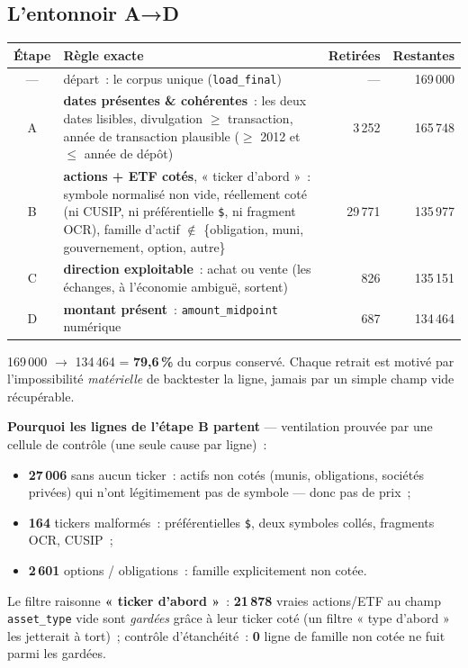 \documentclass[11pt,a4paper]{article}
\newcommand{\co}[1]{\texttt{\small #1}}
\begin{document}
\subsection{L'entonnoir A→D}
\begin{center}\small
\begin{tabular}{c p{9.2cm} r r}
\toprule
\bfseries Étape & \bfseries Règle exacte & \bfseries Retirées & \bfseries Restantes\\
\midrule
— & départ~: le corpus unique (\co{load_final}) & — & 169\,000 \\
A & \textbf{dates présentes \& cohérentes}~: les deux dates lisibles, divulgation $\geq$ transaction,
    année de transaction plausible ($\geq$ 2012 et $\leq$ année de dépôt) & 3\,252 & 165\,748 \\
B & \textbf{actions + ETF cotés}, « ticker d'abord »~: symbole normalisé non vide, réellement coté
    (ni CUSIP, ni préférentielle \co{\$}, ni fragment OCR), famille d'actif
    $\notin$ \{obligation, muni, gouvernement, option, autre\} & 29\,771 & 135\,977 \\
C & \textbf{direction exploitable}~: achat ou vente (les échanges, à l'économie ambiguë, sortent) & 826 & 135\,151 \\
D & \textbf{montant présent}~: \co{amount_midpoint} numérique & 687 & 134\,464 \\
\bottomrule
\end{tabular}
\end{center}
{\footnotesize 169\,000 $\rightarrow$ 134\,464 = \textbf{79,6\,\%} du corpus conservé. Chaque retrait est
motivé par l'impossibilité \emph{matérielle} de backtester la ligne, jamais par un simple champ vide
récupérable.}

\textbf{Pourquoi les lignes de l'étape B partent} — ventilation prouvée par une cellule de contrôle
(une seule cause par ligne)~:
\begin{itemize}[nosep,leftmargin=1.5em]
\item \textbf{27\,006} sans aucun ticker~: actifs non cotés (munis, obligations, sociétés privées) qui
n'ont légitimement pas de symbole — donc pas de prix~;
\item \textbf{164} tickers malformés~: préférentielles \co{\$}, deux symboles collés, fragments OCR,
CUSIP~;
\item \textbf{2\,601} options / obligations~: famille explicitement non cotée.
\end{itemize}
Le filtre raisonne \textbf{« ticker d'abord »}~: \textbf{21\,878} vraies actions/ETF au champ
\co{asset_type} vide sont \emph{gardées} grâce à leur ticker coté (un filtre « type d'abord » les jetterait
à tort)~; contrôle d'étanchéité~: \textbf{0} ligne de famille non cotée ne fuit parmi les gardées.
\end{document}
